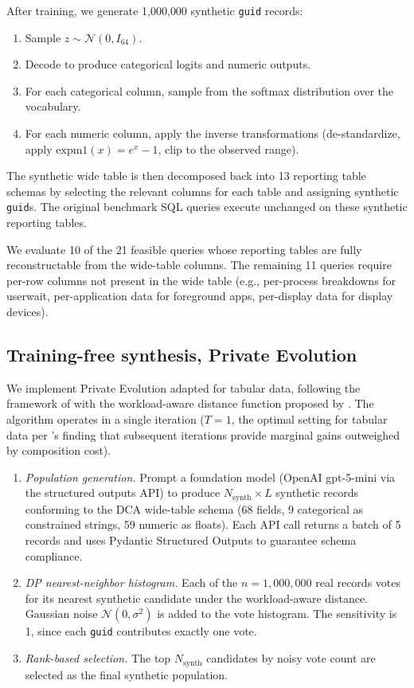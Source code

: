 \documentclass[12pt,letterpaper]{article}
\renewcommand{\_}{\textunderscore\allowbreak}
\begin{document}
After training, we generate 1{,}000{,}000 synthetic \texttt{guid} records:

\begin{enumerate}
    \item Sample $z \sim \mathcal{N}(0, I_{64})$.
    \item Decode to produce categorical logits and numeric outputs.
    \item For each categorical column, sample from the softmax distribution over the vocabulary.
    \item For each numeric column, apply the inverse transformations (de-standardize, apply $\text{expm1}(x) = e^x - 1$, clip to the observed range).
\end{enumerate}

The synthetic wide table is then decomposed back into 13 reporting table schemas by selecting the relevant columns for each table and assigning synthetic \texttt{guid}s. The original benchmark SQL queries execute unchanged on these synthetic reporting tables.

We evaluate 10 of the 21 feasible queries whose reporting tables are fully reconstructable from the wide-table columns. The remaining 11 queries require per-row columns not present in the wide table (e.g., per-process breakdowns for userwait, per-application data for foreground apps, per-display data for display devices).

\subsection{Training-free synthesis, Private Evolution}
\label{sec:methods-pe}

We implement Private Evolution adapted for tabular data, following the framework of \citet{lin2025differentiallyprivatesyntheticdata} with the workload-aware distance function proposed by \citet{swanberg2025apiaccessllmsuseful}. The algorithm operates in a single iteration ($T = 1$, the optimal setting for tabular data per \citeauthor{swanberg2025apiaccessllmsuseful}'s finding that subsequent iterations provide marginal gains outweighed by composition cost).

\begin{enumerate}
    \item \textit{Population generation.} Prompt a foundation model (OpenAI gpt-5-mini via the structured outputs API) to produce $N_{\text{synth}} \times L$ synthetic records conforming to the DCA wide-table schema (68 fields, 9 categorical as constrained strings, 59 numeric as floats). Each API call returns a batch of 5 records and uses Pydantic Structured Outputs to guarantee schema compliance.
    \item \textit{DP nearest-neighbor histogram.} Each of the $n = 1{,}000{,}000$ real records votes for its nearest synthetic candidate under the workload-aware distance. Gaussian noise $\mathcal{N}(0, \sigma^2)$ is added to the vote histogram. The sensitivity is 1, since each \texttt{guid} contributes exactly one vote.
    \item \textit{Rank-based selection.} The top $N_{\text{synth}}$ candidates by noisy vote count are selected as the final synthetic population.
\end{enumerate}
\end{document}
